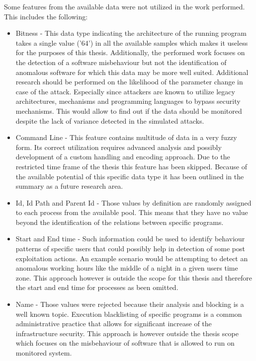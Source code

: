 \documentclass[a4paper,twoside,12pt]{book}
\begin{document}
Some features from the available data were not utilized in the work performed. This includes
the following:
\begin{itemize}
	\item Bitness - This data type indicating the architecture of the running program takes a single value ('64')
	in all the available samples which makes it useless for the purposes of this thesis. Additionally, the performed
	work focuses on the detection of a software misbehaviour but not the identification of anomalous software 
	for which this data may be more well suited. Additional research should be performed on the likelihood of the
	parameter change in case of the attack. Especially since attackers are known to utilize legacy architectures, mechanisms and 
	programming languages to bypass security mechanisms. This would allow to find out if the data should be monitored despite
	the lack of variance detected in the simulated attacks.
	\item Command Line -  This feature contains multitude of data in a very fuzzy form. Its correct utilization
	requires advanced analysis and possibly development of a custom handling and encoding approach. Due 
	to the restricted time frame of the thesis this feature has been skipped. Because of the available potential
	of this specific data type it has been outlined in the summary as a future research area.
	\item Id, Id Path and Parent Id - Those values by definition are randomly assigned to each process from the available
	pool. This means that they have no value beyond the identification of the relations between specific programs. 
	\item Start and End time - Such information could be used to identify behaviour patterns of specific users that could possibly help
	in detection of some post exploitation actions. An example scenario would be attempting to detect an anomalous
	working hours like the middle of a night in a given users time zone. This approach however is outside the 
	scope for this thesis and therefore the start and end time for processes as been omitted.
	\item Name - Those values were rejected because their analysis and blocking is a well known topic. Execution 
	blacklisting of specific programs is a common administrative practice that allows for significant increase
	of the infrastructure security. This approach is however outside the thesis scope which focuses on the 
	misbehaviour of software that is allowed to run on monitored system.
\end{itemize}
\end{document}
